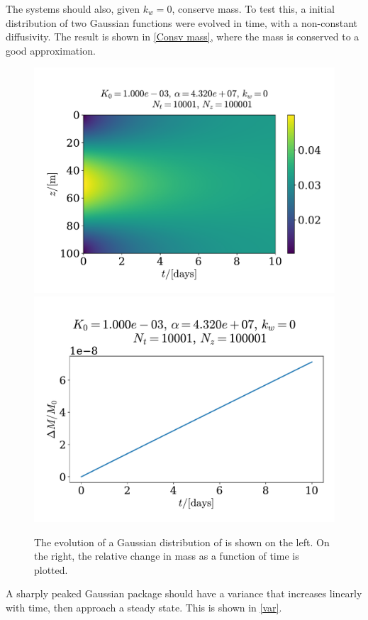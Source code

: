 \documentclass{article}
\begin{document}
    The systems should also, given $k_w=0$, conserve mass. To test this, a initial distribution of two Gaussian functions were evolved in time, with a non-constant diffusivity. The result is shown in \autoref{Consv mass}, where the mass is conserved to a good approximation.

    \begin{figure}
        \centering
        \includegraphics[width=.49\textwidth]{../plots/test2_c}
        \includegraphics[width=.45\textwidth]{../plots/test2_m}
        \caption{The evolution of a Gaussian distribution of  is shown on the left. On the right, the relative change in mass as a function of time is plotted. }
        \label{Consv mass}
    \end{figure}

    A sharply peaked Gaussian package should have a variance that increases linearly with time, then approach a steady state. This is shown in \autoref{var}.
\end{document}
